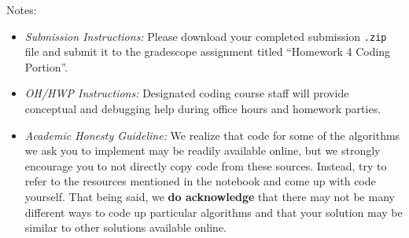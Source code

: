 \documentclass[10.5pt]{article}
\begin{document}
\noindent Notes:
\begin{itemize}
    \item \textit{Submission Instructions:} Please download your completed submission \texttt{.zip} file and submit it to the gradescope assignment titled ``Homework 4 Coding Portion''. 
    
    \item \textit{OH/HWP Instructions:} Designated coding course staff will provide conceptual and debugging help during office hours and homework parties.
    
    \item \textit{Academic Honesty Guideline:} We realize that code for some of the algorithms we ask you to implement may be readily available online, but we strongly encourage you to not directly copy code from these sources. Instead, try to refer to the resources mentioned in the notebook and come up with code yourself. That being said, we \textbf{do acknowledge} that there may not be many different ways to code up particular algorithms and that your solution may be similar to other solutions available online.
    
\
\end{itemize}
\end{document}
